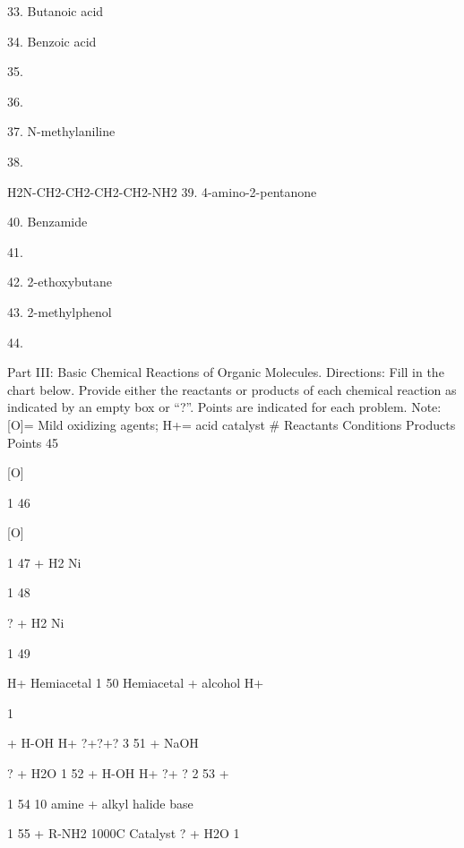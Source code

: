 \documentclass[addpoints, 12pt]{exam}
\begin{document}
\begin{questions}
33.
Butanoic acid

34.
Benzoic acid

35.


36.


37.
N-methylaniline

38.

H2N-CH2-CH2-CH2-CH2-NH2
39.
4-amino-2-pentanone

40.
Benzamide

41.


42.
2-ethoxybutane

43.
2-methylphenol

44.



Part III:  Basic Chemical Reactions of Organic Molecules.
Directions: Fill in the chart below.  Provide either the reactants or products of each chemical reaction as indicated by an empty box or “?”. Points are indicated for each problem. Note: [O]= Mild oxidizing agents; H+= acid catalyst
#
Reactants
Conditions
Products
Points
45

[O]

1
46

[O]

1
47
 + H2
Ni

1
48


?                                                 + H2
Ni

1
49

H+
Hemiacetal
1
50
Hemiacetal + alcohol
H+

1

+ H-OH
H+
?+?+?
3
51
 + NaOH

? + H2O
1
52
+ H-OH
H+
?+ ?
2
53
+


1
54
10 amine + alkyl halide
base

1
55
+ R-NH2
1000C
Catalyst
? + H2O
1


\end{questions}
\end{document}
